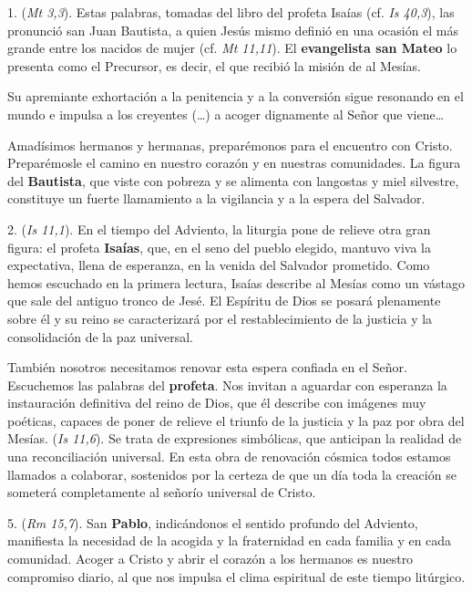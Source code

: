 				\begin{body}
					1.  (\emph{Mt 3,3}). Estas palabras, tomadas del libro del profeta Isaías (cf. \emph{Is 40,3}), las pronunció san Juan Bautista, a quien Jesús mismo definió en una ocasión el más grande entre los nacidos de mujer (cf. \emph{Mt 11,11}). El \textbf{evangelista san Mateo} lo presenta como el Precursor, es decir, el que recibió la misión de  al Mesías. 
					
					Su apremiante exhortación a la penitencia y a la conversión sigue resonando en el mundo e impulsa a los creyentes (\ldots{}) a acoger dignamente al Señor que viene\ldots{} 
					
					Amadísimos hermanos y hermanas, preparémonos para el encuentro con Cristo. Preparémosle el camino en nuestro corazón y en nuestras comunidades. La figura del \textbf{Bautista}, que viste con pobreza y se alimenta con langostas y miel silvestre, constituye un fuerte llamamiento a la vigilancia y a la espera del Salvador. 
					
					2.  (\emph{Is 11,1}). En el tiempo del Adviento, la liturgia pone de relieve otra gran figura: el profeta \textbf{Isaías}, que, en el seno del pueblo elegido, mantuvo viva la expectativa, llena de esperanza, en la venida del Salvador prometido. Como hemos escuchado en la primera lectura, Isaías describe al Mesías como un vástago que sale del antiguo tronco de Jesé. El Espíritu de Dios se posará plenamente sobre él y su reino se caracterizará por el restablecimiento de la justicia y la consolidación de la paz universal. 
					
					También nosotros necesitamos renovar esta espera confiada en el Señor. Escuchemos las palabras del \textbf{profeta}. Nos invitan a aguardar con esperanza la instauración definitiva del reino de Dios, que él describe con imágenes muy poéticas, capaces de poner de relieve el triunfo de la justicia y la paz por obra del Mesías.  (\emph{Is 11,6}). Se trata de expresiones simbólicas, que anticipan la realidad de una reconciliación universal. En esta obra de renovación cósmica todos estamos llamados a colaborar, sostenidos por la certeza de que un día toda la creación se someterá completamente al señorío universal de Cristo. 
					
					5.  (\emph{Rm 15,7}). San \textbf{Pablo}, indicándonos el sentido profundo del Adviento, manifiesta la necesidad de la acogida y la fraternidad en cada familia y en cada comunidad. Acoger a Cristo y abrir el corazón a los hermanos es nuestro compromiso diario, al que nos impulsa el clima espiritual de este tiempo litúrgico. 
					

\end{body}
